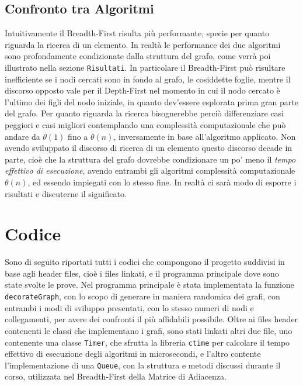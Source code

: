 \documentclass{article}
\begin{document}
\subsection{Confronto tra Algoritmi}
Intuitivamente il Breadth-First risulta pi\`u performante, specie per quanto riguarda la ricerca di un elemento. In realt\`a le performance dei due algoritmi sono profondamente condizionate dalla struttura del grafo, come verr\`a poi illustrato nella sezione \texttt{Risultati}.\newline
In particolare il Breadth-First pu\`o risultare inefficiente se i nodi cercati sono in fondo al grafo, le cosiddette foglie, mentre il discorso opposto vale per il Depth-First nel momento in cui il nodo cercato \`e l'ultimo dei figli del nodo iniziale, in quanto dev'essere esplorata prima gran parte del grafo.\newline
Per quanto riguarda la ricerca bisognerebbe perci\`o differenziare casi peggiori e casi migliori contemplando una complessit\`a computazionale che pu\`o andare da \textit{$\theta(1)$} fino a \textit{$\theta(n)$}, inversamente in base all'algoritmo applicato. \newline
Non avendo sviluppato il discorso di ricerca di un elemento questo discorso decade in parte, cio\`e che la struttura del grafo dovrebbe condizionare un po' meno il \textit{tempo effettivo di esecuzione}, avendo entrambi gli algoritmi complessit\`a computazionale \textit{$\theta(n)$}, ed essendo impiegati con lo stesso fine. In realt\`a ci sar\`a modo di esporre i risultati e discuterne il significato.

\newpage
\section{Codice}
Sono di seguito riportati tutti i codici che compongono il progetto suddivisi in base agli header files, cio\`e i files linkati, e il programma principale dove sono state svolte le prove. \newline
Nel programma principale \`e stata implementata la funzione \texttt{decorateGraph}, con lo scopo di generare in maniera randomica dei grafi, con entrambi i modi di sviluppo presentati, con lo stesso numeri di nodi e collegamenti, per avere dei confronti il pi\`u affidabili possibile.\newline
Oltre ai files header contenenti le classi che implementano i grafi, sono stati linkati altri due file, uno contenente una classe \texttt{Timer}, che sfrutta la libreria \texttt{ctime} per calcolare il tempo effettivo di esecuzione degli algoritmi in microsecondi, e l'altro contente l'implementazione di una \texttt{Queue}, con la struttura e metodi discussi durante il corso, utilizzata nel Breadth-First della Matrice di Adiacenza.
\end{document}
